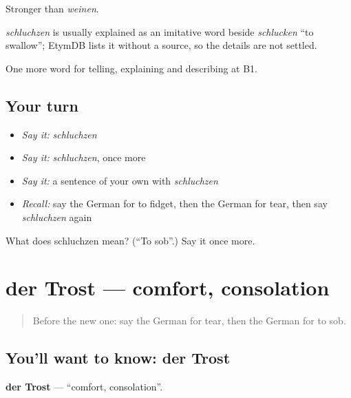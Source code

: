 Stronger than \emph{weinen}.

\begin{cousinweb}
\emph{schluchzen} is usually explained as an imitative word beside \emph{schlucken} \textquotedblleft{}to swallow\textquotedblright{}; EtymDB lists it without a source, so the details are not settled.
\end{cousinweb}

\begin{grammarlens}[title={What you've built}]
One more word for telling, explaining and describing at B1.
\end{grammarlens}

\subsection*{Your turn}
\begin{itemize}
\raggedright
  \item \emph{Say it:} \emph{schluchzen}
  \item \emph{Say it:} \emph{schluchzen}, once more
  \item \emph{Say it:} a sentence of your own with \emph{schluchzen}
  \item \emph{Recall:} say the German for to fidget, then the German for tear, then say \emph{schluchzen} again
\end{itemize}

\begin{tcolorbox}[breakable,colback=teal!4,colframe=teal!35!black,title={Before you move on}]
What does schluchzen mean? (\textquotedblleft{}To sob\textquotedblright{}.) Say it once more.
\end{tcolorbox}
\section[der Trost]{der Trost — comfort, consolation}

\label{lesson:GE-C471-trost}



\begin{quote}
Before the new one: say the German for tear, then the German for to sob.
\end{quote}

\subsection*{You'll want to know: der Trost}
\textbf{der Trost} — \textquotedblleft{}comfort, consolation\textquotedblright{}.

